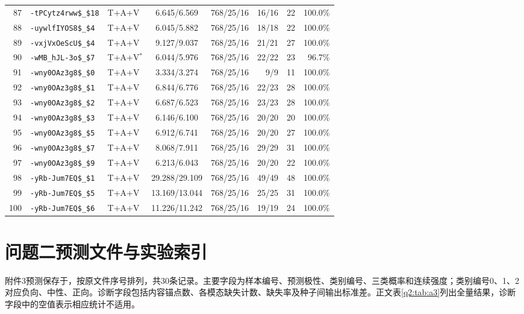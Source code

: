 \begin{table}[!ht]
\begin{tabular}{rllccrrr}
87 & \texttt{-tPCytz4rww\$\_\$18} & T+A+V & 6.645/6.569 & 768/25/16 & 16/16 & 22 & 100.0\% \\
88 & \texttt{-uywlfIYOS8\$\_\$4} & T+A+V & 6.045/5.882 & 768/25/16 & 18/18 & 22 & 100.0\% \\
89 & \texttt{-vxjVxOeScU\$\_\$4} & T+A+V & 9.127/9.037 & 768/25/16 & 21/21 & 27 & 100.0\% \\
90 & \texttt{-wMB\_hJL-3o\$\_\$7} & T+A+V$^{*}$ & 6.044/5.976 & 768/25/16 & 22/22 & 23 & 96.7\% \\
91 & \texttt{-wny0OAz3g8\$\_\$0} & T+A+V & 3.334/3.274 & 768/25/16 & 9/9 & 11 & 100.0\% \\
92 & \texttt{-wny0OAz3g8\$\_\$1} & T+A+V & 6.844/6.776 & 768/25/16 & 22/23 & 28 & 100.0\% \\
93 & \texttt{-wny0OAz3g8\$\_\$2} & T+A+V & 6.687/6.523 & 768/25/16 & 23/23 & 28 & 100.0\% \\
94 & \texttt{-wny0OAz3g8\$\_\$3} & T+A+V & 6.146/6.100 & 768/25/16 & 20/20 & 20 & 100.0\% \\
95 & \texttt{-wny0OAz3g8\$\_\$5} & T+A+V & 6.912/6.741 & 768/25/16 & 20/20 & 27 & 100.0\% \\
96 & \texttt{-wny0OAz3g8\$\_\$7} & T+A+V & 8.068/7.911 & 768/25/16 & 29/29 & 31 & 100.0\% \\
97 & \texttt{-wny0OAz3g8\$\_\$9} & T+A+V & 6.213/6.043 & 768/25/16 & 20/20 & 22 & 100.0\% \\
98 & \texttt{-yRb-Jum7EQ\$\_\$1} & T+A+V & 29.288/29.109 & 768/25/16 & 49/49 & 48 & 100.0\% \\
99 & \texttt{-yRb-Jum7EQ\$\_\$5} & T+A+V & 13.169/13.044 & 768/25/16 & 25/25 & 31 & 100.0\% \\
100 & \texttt{-yRb-Jum7EQ\$\_\$6} & T+A+V & 11.226/11.242 & 768/25/16 & 19/19 & 24 & 100.0\% \\
\bottomrule
\end{tabular}
\end{table}
\clearpage

\FloatBarrier
\section{问题二预测文件与实验索引}
\label{app:q2-files}
附件3预测保存于，按原文件序号排列，共30条记录。主要字段为样本编号、预测极性、类别编号、三类概率和连续强度；类别编号0、1、2对应负向、中性、正向。诊断字段包括内容锚点数、各模态缺失计数、缺失率及种子间输出标准差。正文表\ref{q2:tab:a3}列出全量结果，诊断字段中的空值表示相应统计不适用。

